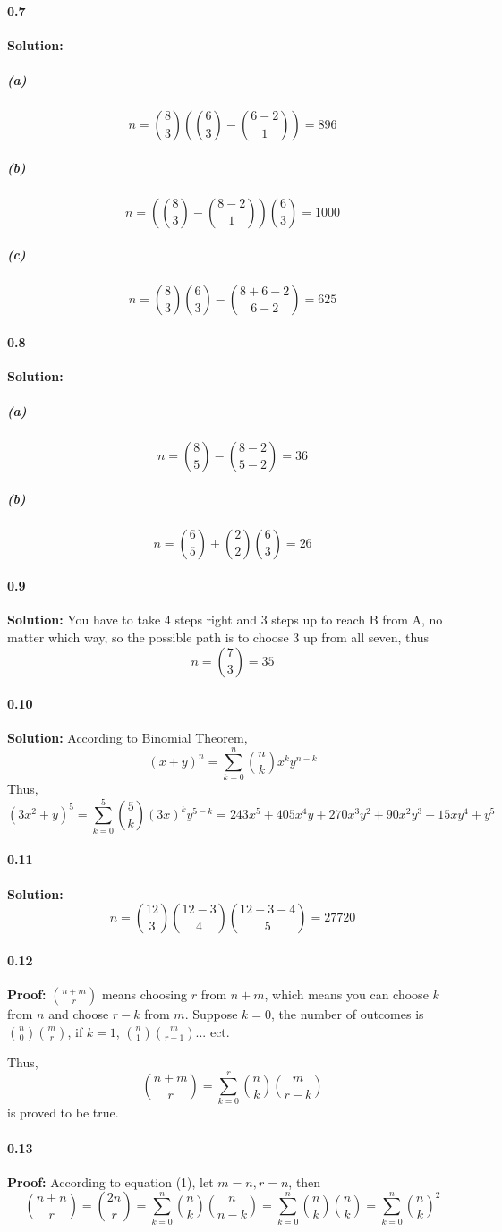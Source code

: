 \documentclass[11pt]{report}
\begin{document}
\paragraph{0.7}\textbf{Solution:}
    \subparagraph{(a)}\[n = \binom{8}{3}(\binom{6}{3} - \binom{6 - 2}{1}) = 896\]
    \subparagraph{(b)}\[n = (\binom{8}{3} - \binom{8-2}{1})\binom{6}{3} = 1000\]
    \subparagraph{(c)}\[n = \binom{8}{3} \binom{6}{3} - \binom{8 + 6 - 2}{6 - 2} = 625\]
\paragraph{0.8}\textbf{Solution:} 
    \subparagraph{(a)} \[n = \binom{8}{5} - \binom{8 - 2}{5 - 2} = 36\]
    \subparagraph{(b)} \[n = \binom{6}{5} + \binom{2}{2} \binom{6}{3} = 26\]
\paragraph{0.9}\textbf{Solution:} You have to take 4 steps right and 3 steps up to reach B from A, no matter which way, so the possible path is to choose 3 up from all seven, thus \[n = \binom{7}{3} = 35\]
\paragraph{0.10}\textbf{Solution:} According to Binomial Theorem, \[(x + y)^n = \sum^n_{k = 0}\binom{n}{k}x^ky^{n-k}\]
Thus, \[(3x^2+y)^5 = \sum^5_{k=0}\binom{5}{k}(3x)^ky^{5-k} = 243 x^5+405 x^4 y+270 x^3 y^2+90 x^2 y^3+15 x y^4+y^5
 \]
\paragraph{0.11}\textbf{Solution:} \[n = \binom{12}{3} \binom{12 - 3}{4} \binom{12 - 3 - 4}{5} = 27720\]
\paragraph{0.12}\textbf{Proof:} $\binom{n+m}{r}$ means choosing $r$ from $n + m$, which means you can choose $k$ from $n$ and choose $r - k$ from $m$. Suppose $k = 0$, the number of outcomes is $\binom{n}{0}\binom{m}{r}$, if $k = 1$, $\binom{n}{1}\binom{m}{r-1}$... ect.

  Thus, 
  \begin{equation}
  \binom{n+m}{r} = \sum_{k = 0}^r \binom{n}{k}\binom{m}{r - k}
  \end{equation}
  is proved to be true.
\paragraph{0.13}\textbf{Proof:} According to equation (1), let $m = n, r = n$, then \[\binom{n + n}{r} = \binom{2n}{r} = \sum_{k=0}^n \binom{n}{k} \binom{n}{n-k} = \sum_{k=0}^n \binom{n}{k} \binom{n}{k} = \sum_{k=0}^n \binom{n}{k}^2\]
\end{document}
